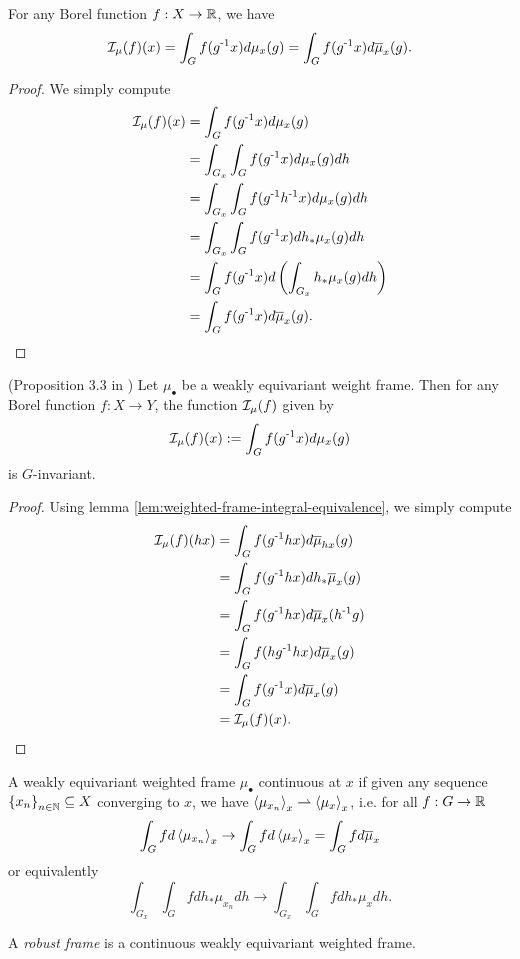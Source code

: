 \begin{lemma}\label{lem:weighted-frame-integral-equivalence}
    For any Borel function $f : X \to \mathbb{R}$, we have
    \[
        \mathcal{I}_\mu (f) (x)
        = \int_G f(g^{\text{-}1} x) d\mu_x (g)
        = \int_G f(g^{\text{-}1} x) d\overline{\mu}_x (g).
    \]
    \begin{proof}
        We simply compute
        \begin{align*}
            \mathcal{I}_\mu (f) (x)
            &= \int_G f(g^{\text{-}1} x) d\mu_x (g) \\
            &= \int_{G_x} \int_G f(g^{\text{-}1} x) d\mu_x (g) dh \\
            &= \int_{G_x} \int_G f(g^{\text{-}1} h^{\text{-}1} x) d\mu_x (g) dh \\
            &= \int_{G_x} \int_G f(g^{\text{-}1} x) dh_* \mu_x (g) dh \\
            &= \int_G f(g^{\text{-}1} x) d\left( \int_{G_x} h_* \mu_x (g) dh \right) \\
            &= \int_G f(g^{\text{-}1} x) d\overline{\mu}_x (g).
        \end{align*}
    \end{proof}
\end{lemma}

\begin{proposition}
    (Proposition 3.3 in \cite{dym2024equivariant})
    Let $\mu_\bullet$ be a weakly equivariant weight frame.
    Then for any Borel function $f : X \to Y$, the function $\mathcal{I}_\mu (f)$ given by
    \[
        \mathcal{I}_\mu (f) (x) := \int_G f(g^{\text{-}1} x) d\mu_x(g)
    \]
    is $G$-invariant.
    \begin{proof}
        Using lemma \ref{lem:weighted-frame-integral-equivalence}, we simply compute
        \begin{align*}
            \mathcal{I}_\mu (f) (hx)
            &= \int_G f(g^{\text{-}1} h x) d\overline{\mu}_{hx}(g) \\
            &= \int_G f(g^{\text{-}1} h x) dh_* \overline{\mu}_x(g) \\
            &= \int_G f(g^{\text{-}1} h x) d \overline{\mu}_x(h^{\text{-}1}g) \\
            &= \int_G f(hg^{\text{-}1} h x) d \overline{\mu}_x(g) \\
            &= \int_G f(g^{\text{-}1} x) d \overline{\mu}_x(g) \\
            &= \mathcal{I}_\mu (f) (x).
        \end{align*}
    \end{proof}
\end{proposition}

\begin{definition}
    A weakly equivariant weighted frame $\mu_\bullet$ continuous at $x$ if given any sequence $\left\{ x_n \right\}_{n \in \mathbb{N}} \subseteq X$ converging to $x$, we have $\left\langle \mu_{x_n} \right\rangle_x \rightharpoonup \left\langle \mu_x \right\rangle_x$, i.e. for all $f : G \to \mathbb{R}$
    \[
        \int_{G} f d\left\langle \mu_{x_n} \right\rangle_x
        \to \int_{G} f d\left\langle \mu_{x} \right\rangle_x
        = \int_{G} f d\overline{\mu}_{x}
    \]
    or equivalently
    \[
        \int_{G_x} \int_{G} f dh_*\mu_{x_n} dh
        \to \int_{G_x} \int_{G} f dh_*\mu_{x} dh.
    \]
    
    A \emph{robust frame} is a continuous weakly equivariant weighted frame.
\end{definition}


